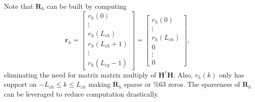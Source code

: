 Note that $\mathbf{R}_{h}$ can be built by computing
\begin{equation}
\mathbf{r}_h = 
\begin{bmatrix} r_{h}(0) \\ \vdots \\ r_{h}(L_{ch}) \\ r_{h}(L_{ch}+1) \\ \vdots \\ r_{h}(L_{eq}-1)\end{bmatrix} =
\begin{bmatrix} r_{h}(0) \\ \vdots \\ r_{h}(L_{ch}) \\ 0 \\ \vdots \\ 0  \end{bmatrix},
\end{equation} 
eliminating the need for matrix matrix multiply of $\mathbf{H}^\dagger\mathbf{H}$.
Also, $r_{h}(k)$ only has support on $-L_{ch} \leq k \leq L_{ch}$ making $\mathbf{R}_{h}$ sparse or $\%63$ zeros.
The sparseness of $\mathbf{R}_{h}$ can be leveraged to reduce computation drastically.

